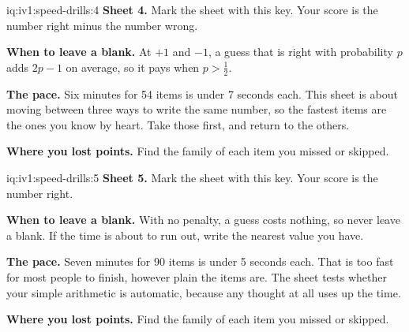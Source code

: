 \begin{solution}{iq:iv1:speed-drills:4}
\textbf{Sheet 4.} Mark the sheet with this key. Your score is the number right minus the number wrong.
\par\nopagebreak


\textbf{When to leave a blank.} At $+1$ and $-1$, a guess that is right with probability $p$ adds $2p - 1$ on average, so it pays when $p > \tfrac12$.

\textbf{The pace.} Six minutes for 54 items is under 7 seconds each. This sheet is about moving between three ways to write the same number, so the fastest items are the ones you know by heart. Take those first, and return to the others.

\textbf{Where you lost points.} Find the family of each item you missed or skipped.


\end{solution}

\begin{solution}{iq:iv1:speed-drills:5}
\textbf{Sheet 5.} Mark the sheet with this key. Your score is the number right.
\par\nopagebreak


\textbf{When to leave a blank.} With no penalty, a guess costs nothing, so never leave a blank. If the time is about to run out, write the nearest value you have.

\textbf{The pace.} Seven minutes for 90 items is under 5 seconds each. That is too fast for most people to finish, however plain the items are. The sheet tests whether your simple arithmetic is automatic, because any thought at all uses up the time.

\textbf{Where you lost points.} Find the family of each item you missed or skipped.


\end{solution}

